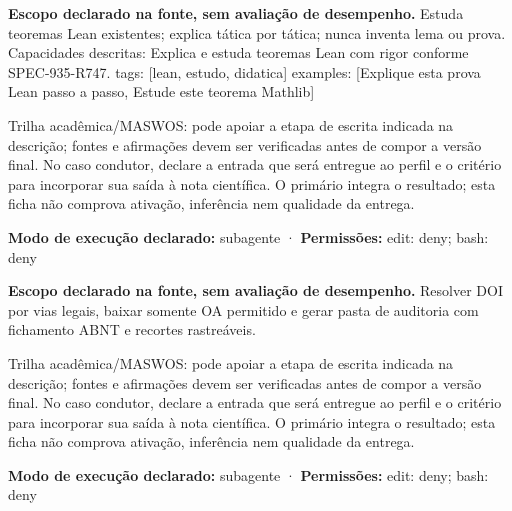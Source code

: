 \begin{descricao}
\textbf{Escopo declarado na fonte, sem avaliação de desempenho.}
Estuda teoremas Lean existentes; explica tática por tática; nunca inventa lema ou prova. Capacidades descritas: Explica e estuda teoremas Lean com rigor conforme SPEC-935-R747. tags: [lean, estudo, didatica] examples: [Explique esta prova Lean passo a passo, Estude este teorema Mathlib]
\end{descricao}

\begin{funcao}
Trilha acadêmica/MASWOS: pode apoiar a etapa de escrita indicada na descrição; fontes e afirmações devem ser verificadas antes de compor a versão final. No caso condutor, declare a entrada que será entregue ao perfil e o critério para incorporar sua saída à nota científica. O primário integra o resultado; esta ficha não comprova ativação, inferência nem qualidade da entrega.
\end{funcao}

\begin{arquitetura}
\textbf{Modo de execução declarado:} subagente · \textbf{Permissões:} edit: deny; bash: deny
\end{arquitetura}


\begin{descricao}
\textbf{Escopo declarado na fonte, sem avaliação de desempenho.}
Resolver DOI por vias legais, baixar somente OA permitido e gerar pasta de auditoria com fichamento ABNT e recortes rastreáveis.
\end{descricao}

\begin{funcao}
Trilha acadêmica/MASWOS: pode apoiar a etapa de escrita indicada na descrição; fontes e afirmações devem ser verificadas antes de compor a versão final. No caso condutor, declare a entrada que será entregue ao perfil e o critério para incorporar sua saída à nota científica. O primário integra o resultado; esta ficha não comprova ativação, inferência nem qualidade da entrega.
\end{funcao}

\begin{arquitetura}
\textbf{Modo de execução declarado:} subagente · \textbf{Permissões:} edit: deny; bash: deny
\end{arquitetura}

